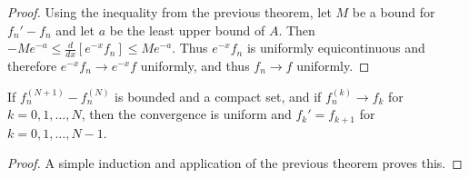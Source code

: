 \documentclass[crop=false,class=book]{standalone}
\begin{document}
\begin{proof}
Using the inequality from the previous theorem, let $M$ be a bound for $f_n'-f_n$ and let $a$ be the least upper bound of $A$. Then $-Me^{-a}\leq \frac{d}{dx}[e^{-x}f_n] \leq Me^{-a}$. Thus $e^{-x}f_n$ is uniformly equicontinuous and therefore $e^{-x}f_n\rightarrow e^{-x}f$ uniformly, and thus $f_n\rightarrow f$ uniformly.
\end{proof}
\begin{corollary}
If $f_n^{(N+1)}-f_n^{(N)}$ is bounded and a compact set, and if $f_n^{(k)}\rightarrow f_k$ for $k=0,1,\hdots, N$, then the convergence is uniform and $f_{k}' = f_{k+1}$ for $k=0,1,\hdots,N-1$.
\end{corollary}
\begin{proof}
A simple induction and application of the previous theorem proves this.
\end{proof}
\end{document}
